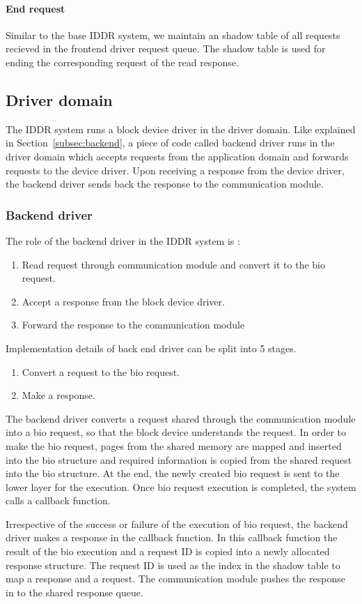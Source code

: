 \paragraph{End request}
Similar to the base IDDR system, we maintain an shadow table of all requests recieved in the frontend driver request queue. The shadow table is used for ending the corresponding request of the read response. 

\subsection{Driver domain}
The IDDR system runs a block device driver in the driver domain. Like explained in Section~\ref{subsec:backend}, a piece of code called backend driver runs in the driver domain which accepts requests from the application domain and forwards requests to the device driver. Upon receiving a response from the device driver, the backend driver sends back the response to the communication module.

\subsubsection*{Backend driver}
The role of the backend driver in the IDDR system is :
\begin{enumerate}
\item Read request through communication module and convert it to the bio request.
\item Accept a response from the block device driver.
\item Forward the response to the communication module
\end{enumerate}

Implementation details of back end driver can be split into 5 stages. 
\begin{enumerate}
\item Convert a request to the bio request. 
\item Make a response.
\end{enumerate}

\label{subsec:createbio}
The backend driver converts a request shared through the communication module into a bio request, so that the block device understands the request. In order to make the bio request, pages from the shared memory are mapped and inserted into the bio structure and required information is copied from the shared request into the bio structure. At the end, the newly created bio request is sent to the lower layer for the execution. Once bio request execution is completed, the system calls a callback function.

Irrespective of the success or failure of the execution of bio request, the backend driver makes a response in the callback function. In this callback function the result of the bio execution and a request ID is copied into a newly allocated response structure. The request ID is used as the index in the shadow table to map a response and a request. The communication module pushes the response in to the shared response queue.

% 
